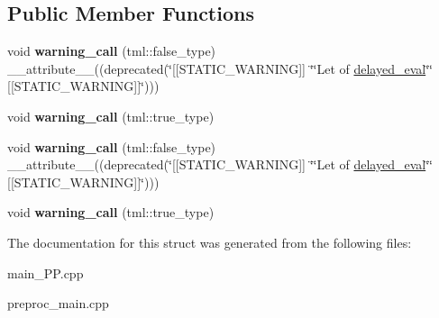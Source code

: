 \subsection*{Public Member Functions}
\begin{DoxyCompactItemize}
\item 
\hypertarget{structtml_1_1impl_1_1let__impl__low_3_01NAME_00_01VALUE_00_01tml_1_1delayed__eval_3_01F_00_01ARGfa1b3cb6d23c24dca45f4e96234fdcd1_a86624e5a6eed076b26502b5d207033e9}{void {\bfseries warning\+\_\+call} (tml\+::false\+\_\+type) \+\_\+\+\_\+attribute\+\_\+\+\_\+((deprecated(\char`\"{}\mbox{[}\mbox{[}S\+T\+A\+T\+I\+C\+\_\+\+W\+A\+R\+N\+I\+N\+G\mbox{]}\mbox{]} \char`\"{}\char`\"{}Let of \hyperlink{structtml_1_1delayed__eval}{delayed\+\_\+eval}\char`\"{}\char`\"{} \mbox{[}\mbox{[}S\+T\+A\+T\+I\+C\+\_\+\+W\+A\+R\+N\+I\+N\+G\mbox{]}\mbox{]}\char`\"{})))}\label{structtml_1_1impl_1_1let__impl__low_3_01NAME_00_01VALUE_00_01tml_1_1delayed__eval_3_01F_00_01ARGfa1b3cb6d23c24dca45f4e96234fdcd1_a86624e5a6eed076b26502b5d207033e9}

\item 
\hypertarget{structtml_1_1impl_1_1let__impl__low_3_01NAME_00_01VALUE_00_01tml_1_1delayed__eval_3_01F_00_01ARGfa1b3cb6d23c24dca45f4e96234fdcd1_a2f87c41198efa8b5d524c3195330ecbb}{void {\bfseries warning\+\_\+call} (tml\+::true\+\_\+type)}\label{structtml_1_1impl_1_1let__impl__low_3_01NAME_00_01VALUE_00_01tml_1_1delayed__eval_3_01F_00_01ARGfa1b3cb6d23c24dca45f4e96234fdcd1_a2f87c41198efa8b5d524c3195330ecbb}

\item 
\hypertarget{structtml_1_1impl_1_1let__impl__low_3_01NAME_00_01VALUE_00_01tml_1_1delayed__eval_3_01F_00_01ARGfa1b3cb6d23c24dca45f4e96234fdcd1_a86624e5a6eed076b26502b5d207033e9}{void {\bfseries warning\+\_\+call} (tml\+::false\+\_\+type) \+\_\+\+\_\+attribute\+\_\+\+\_\+((deprecated(\char`\"{}\mbox{[}\mbox{[}S\+T\+A\+T\+I\+C\+\_\+\+W\+A\+R\+N\+I\+N\+G\mbox{]}\mbox{]} \char`\"{}\char`\"{}Let of \hyperlink{structtml_1_1delayed__eval}{delayed\+\_\+eval}\char`\"{}\char`\"{} \mbox{[}\mbox{[}S\+T\+A\+T\+I\+C\+\_\+\+W\+A\+R\+N\+I\+N\+G\mbox{]}\mbox{]}\char`\"{})))}\label{structtml_1_1impl_1_1let__impl__low_3_01NAME_00_01VALUE_00_01tml_1_1delayed__eval_3_01F_00_01ARGfa1b3cb6d23c24dca45f4e96234fdcd1_a86624e5a6eed076b26502b5d207033e9}

\item 
\hypertarget{structtml_1_1impl_1_1let__impl__low_3_01NAME_00_01VALUE_00_01tml_1_1delayed__eval_3_01F_00_01ARGfa1b3cb6d23c24dca45f4e96234fdcd1_a2f87c41198efa8b5d524c3195330ecbb}{void {\bfseries warning\+\_\+call} (tml\+::true\+\_\+type)}\label{structtml_1_1impl_1_1let__impl__low_3_01NAME_00_01VALUE_00_01tml_1_1delayed__eval_3_01F_00_01ARGfa1b3cb6d23c24dca45f4e96234fdcd1_a2f87c41198efa8b5d524c3195330ecbb}

\end{DoxyCompactItemize}


The documentation for this struct was generated from the following files\+:\begin{DoxyCompactItemize}
\item 
main\+\_\+\+P\+P.\+cpp\item 
preproc\+\_\+main.\+cpp\end{DoxyCompactItemize}
